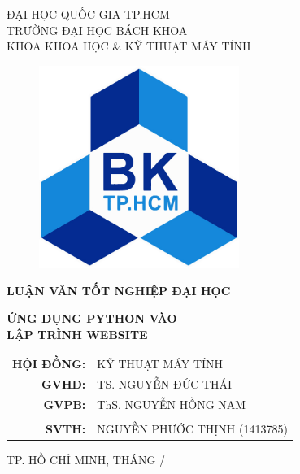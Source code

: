\begin{titlepage}
	\begin{center}
		\large ĐẠI HỌC QUỐC GIA TP.HCM\\TRƯỜNG ĐẠI HỌC BÁCH KHOA\\KHOA KHOA HỌC \& KỸ THUẬT MÁY TÍNH
	\end{center}
	\begin{figure}[!ht]
		\begin{center}
			\includegraphics[width=65mm]{images/logobk.jpg}
		\end{center}
	\end{figure}
	\begin{center}
		\textbf{\large LUẬN VĂN TỐT NGHIỆP ĐẠI HỌC}
	\end{center}
	\vspace{5mm}
	\begin{center}
		\textbf{\Huge ỨNG DỤNG PYTHON VÀO\\LẬP TRÌNH WEBSITE}
	\end{center}
	\vspace{5mm}
	\begin{table}[!ht]
		\raggedleft
		\large
		\begin{tabular}{rl}
			\textbf{HỘI ĐỒNG:} & KỸ THUẬT MÁY TÍNH\\
			\textbf{GVHD:} & TS. NGUYỄN ĐỨC THÁI\\
			\textbf{GVPB:} & ThS. NGUYỄN HỒNG NAM\\
			\\
			\textbf{SVTH:} & NGUYỄN PHƯỚC THỊNH (1413785)\\
		\end{tabular}
	\end{table}
	\vfill
	\begin{center}
		\large TP. HỒ CHÍ MINH, THÁNG \the\month /\the\year
	\end{center}
\end{titlepage}